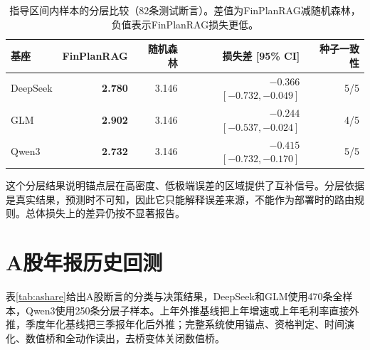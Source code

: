 \begin{table}[htbp]
\centering
{}
\setlength{\tabcolsep}{4pt}
\caption{指导区间内样本的分层比较（82条测试断言）。差值为FinPlanRAG减随机森林，负值表示FinPlanRAG损失更低。}
\label{tab:within}
\begin{tabular}{lrrrr}
\toprule
基座 & FinPlanRAG & 随机森林 & 损失差 [95\% CI] & 种子一致性 \\
\midrule
DeepSeek & \textbf{2.780} & 3.146 & $-0.366$ $[-0.732,-0.049]$ & 5/5 \\
GLM & \textbf{2.902} & 3.146 & $-0.244$ $[-0.537,-0.024]$ & 4/5 \\
Qwen3 & \textbf{2.732} & 3.146 & $-0.415$ $[-0.732,-0.170]$ & 5/5 \\
\bottomrule
\end{tabular}
\end{table}

这个分层结果说明锚点层在高密度、低极端误差的区域提供了互补信号。分层依据是真实结果，预测时不可知，因此它只能解释误差来源，不能作为部署时的路由规则。总体损失上的差异仍按不显著报告。

\section{A股年报历史回测}
\label{sec:ashare}

表\ref{tab:ashare}给出A股断言的分类与决策结果，DeepSeek和GLM使用470条全样本，Qwen3使用250条分层子样本。上年外推基线把上年增速或上年毛利率直接外推，季度年化基线把三季报年化后外推；完整系统使用锚点、资格判定、时间演化、数值桥和全动作读出，去桥变体关闭数值桥。

